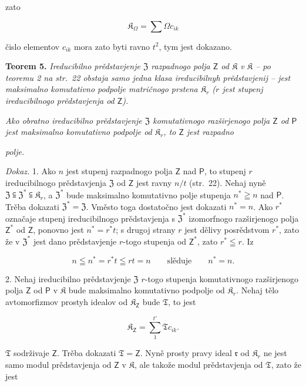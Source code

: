 \documentclass[11pt]{article}
\begin{document}
zato

\[
\mathfrak K_\Omega=\sum\Omega c_{ik}
\]

čislo elementov \(c_{ik}\) mora zato byti ravno \(t^2\), tym jest dokazano.

\textbf{Teorem 5.} \emph{Ireducibilno prědstavjenje \(\mathfrak Z\) razpadnogo polja \(\mathsf{Z}\) od \(\mathfrak K\) v \(\mathfrak K\) -- po teoremu 2 na str.~22 obstaja samo jedna klasa ireducibilnyh prědstavjenij -- jest maksimalno komutativno podpolje matričnogo prstena \(\mathfrak K_r\) (\(r\) jest stupenj ireducibilnogo prědstavjenja od \(\mathsf{Z}\)).}

\emph{Ako obratno ireducibilno prědstavjenje \(\mathfrak Z\) komutativnogo razširjenogo polja \(\mathsf{Z}\) od \(\mathsf P\) jest maksimalno komutativno podpolje od \(\mathfrak K_r\), to \(\mathsf{Z}\) jest razpadno}

\emph{polje.}

\emph{Dokaz.} 1. Ako \(n\) jest stupenj razpadnogo polja \(\mathsf{Z}\) nad \(\mathsf P\), to stupenj \(r\) ireducibilnogo prědstavjenja \(\mathfrak Z\) od \(\mathsf{Z}\) jest ravny \(n/t\) (str.~22). Nehaj nyně \(\mathfrak Z\subseteqq\mathfrak Z^*\subseteqq\mathfrak K_r\), a \(\mathfrak Z^*\) bude maksimalno komutativno polje stupenja \(n^*\geqq n\) nad \(\mathsf P\). Trěba dokazati \(\mathfrak Z^*=\mathfrak Z\). Vměsto toga dostatočno jest dokazati \(n^*=n\). Ako \(r^*\) označaje stupenj ireducibilnogo prědstavjenja s \(\mathfrak Z^*\) izomorfnogo razširjenogo polja \(\mathsf{Z}^*\) od \(\mathsf{Z}\), ponovno jest \(n^*=r^*t\); s drugoj strany \(r\) jest dělivy posrědstvom \(r^*\), zato že v \(\mathfrak Z^*\) jest dano prědstavjenje \(r\)-togo stupenja od \(\mathsf{Z}^*\), zato \(r^*\leqq r\). Iz

\[
n\leqq n^*=r^*t\leqq rt=n \qquad\text{slěduje}\qquad n^*=n.
\]

2. Nehaj ireducibilno prědstavjenje \(\mathfrak Z\) \(r\)-togo stupenja komutativnogo razširjenogo polja \(\mathsf{Z}\) od \(\mathsf P\) v \(\mathfrak K\) bude maksimalno komutativno podpolje od \(\mathfrak K_r\). Nehaj tělo avtomorfizmov prostyh idealov od \(\mathfrak K_{\mathsf{Z}}\) bude \(\mathfrak T\), to jest

\[
\mathfrak K_{\mathsf{Z}}=\sum_{1}^{t'}\mathfrak T c_{ik}.
\]

\(\mathfrak T\) sodrživaje \(\mathsf{Z}\). Trěba dokazati \(\mathfrak T=\mathsf{Z}\). Nyně prosty pravy ideal \(\mathfrak r\) od \(\mathfrak K_r\) ne jest samo modul prědstavjenja od \(\mathsf{Z}\) v \(\mathfrak K\), ale takože modul prědstavjenja od \(\mathfrak T\), zato že jest
\end{document}
